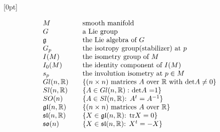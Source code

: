 \documentclass[twoside,12pt]{article}
\begin{document}
\renewcommand{\thepage}{\alph{page}}



\clearpage








\def\contentsname{CONTENTS}
\def\thesection{Chapter \arabic{section}}
\def\thesubsection{\arabic{section}.\arabic{subsection}}
\def\contentsname{\section*{CONTENTS}}

\def\thetheorem{\arabic{section}.\arabic{theorem}}

[0pt]{\addvspace{4mm}\filright}
{\bfseries\contentspush{\bfseries{\thecontentslabel}\hspace{1.2mm}\ }}
{}{\hspace*{0em}\bf{\contentspage}}
\clearpage

\listoffigures
$$
\begin{array}{lll}
M & &\text{smooth manifold}\\
G & &\text{a Lie group}\\
{\mathfrak g} & &\text{the Lie algebra of $G$}\\
G_p & & \text{the isotropy group(stabilizer) at $p$}\\
I(M)& &\text{the isometry group of $M$}\\
I_0(M)& &\text{the identity component of $I(M)$}\\
s_p& &\text{the involution isometry at $p\in M$}\\
Gl(n,\mathbb{R}) & & \text{\{($n\times n$) matrices $A$ over $\mathbb{R}$ with det$A\neq0$\}}\\
Sl(n,\mathbb{R}) & &\text{\{$A\in Gl(n,\mathbb{R}):$ det$A$ =1\}}\\
SO(n) & &\text{\{$A\in Sl(n,\mathbb{R})$: $A^t=A^{-1}$\}}\\
\mathfrak {gl}(n,\mathbb{R})& &\text{\{($n\times n$) matrices $A$ over $\mathbb{R}$\}}\\
\mathfrak{sl}(n,\mathbb{R})& &\text{\{$X\in \mathfrak {gl}(n,\mathbb{R})$: tr$X=0$\}}\\
\mathfrak{so}(n)& &\text{\{$X\in \mathfrak {sl}(n,\mathbb{R})$: $X^t=-X$\}}
\end{array}
$$



\clearpage
\end{document}
